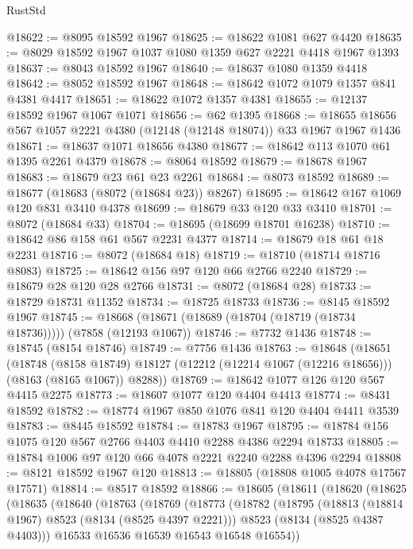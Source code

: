 \begin{lexlean}{RustStd}
\begin{coremodule}
{\begin{coremodule}
{{{{{{{{{{{{{{{{{{{{{{{{{{{{{{{{{{{{{{{{{{{{{{{{{{{{{@18622 := @8095 @18592 @1967
@18625 := @18622 @1081 @627 @4420
@18635 := @8029 @18592 @1967 @1037 @1080 @1359 @627 @2221 @4418 @1967 @1393
@18637 := @8043 @18592 @1967
@18640 := @18637 @1080 @1359 @4418
@18642 := @8052 @18592 @1967
@18648 := @18642 @1072 @1079 @1357 @841 @4381 @4417
@18651 := @18622 @1072 @1357 @4381
@18655 := @12137 @18592 @1967 @1067 @1071
@18656 := @62 @1395
@18668 := @18655 @18656 @567 @1057 @2221 @4380 (@12148 (@12148 @18074)) @33 @1967 @1967 @1436
@18671 := @18637 @1071 @18656 @4380
@18677 := @18642 @113 @1070 @61 @1395 @2261 @4379
@18678 := @8064 @18592
@18679 := @18678 @1967
@18683 := @18679 @23 @61 @23 @2261
@18684 := @8073 @18592
@18689 := @18677 (@18683 (@8072 (@18684 @23)) @8267)
@18695 := @18642 @167 @1069 @120 @831 @3410 @4378
@18699 := @18679 @33 @120 @33 @3410
@18701 := @8072 (@18684 @33)
@18704 := @18695 (@18699 @18701 @16238)
@18710 := @18642 @86 @158 @61 @567 @2231 @4377
@18714 := @18679 @18 @61 @18 @2231
@18716 := @8072 (@18684 @18)
@18719 := @18710 (@18714 @18716 @8083)
@18725 := @18642 @156 @97 @120 @66 @2766 @2240
@18729 := @18679 @28 @120 @28 @2766
@18731 := @8072 (@18684 @28)
@18733 := @18729 @18731 @11352
@18734 := @18725 @18733
@18736 := @8145 @18592 @1967
@18745 := @18668 (@18671 (@18689 (@18704 (@18719 (@18734 @18736))))) (@7858 (@12193 @1067))
@18746 := @7732 @1436
@18748 := @18745 (@8154 @18746)
@18749 := @7756 @1436
@18763 := @18648
    (@18651
      (@18748
        (@8158 @18749)
        @18127
        (@12212 (@12214 @1067 (@12216 @18656)))
        (@8163 (@8165 @1067))
        @8288))
@18769 := @18642 @1077 @126 @120 @567 @4415 @2275
@18773 := @18607 @1077 @120 @4404 @4413
@18774 := @8431 @18592
@18782 := @18774 @1967 @850 @1076 @841 @120 @4404 @4411 @3539
@18783 := @8445 @18592
@18784 := @18783 @1967
@18795 := @18784 @156 @1075 @120 @567 @2766 @4403 @4410 @2288 @4386 @2294 @18733
@18805 := @18784 @1006 @97 @120 @66 @4078 @2221 @2240 @2288 @4396 @2294
@18808 := @8121 @18592 @1967 @120
@18813 := @18805 (@18808 @1005 @4078 @17567 @17571)
@18814 := @8517 @18592
@18866 := @18605
    (@18611
      (@18620
        (@18625
          (@18635
            (@18640
              (@18763
                (@18769
                  (@18773
                    (@18782
                      (@18795
                        (@18813 (@18814 @1967) @8523 (@8134 (@8525 @4397 @2221)))
                        @8523
                        (@8134 (@8525 @4387 @4403)))
                      @16533
                      @16536
                      @16539
                      @16543
                      @16548
                      @16554))
}}}}}}}}}}}}}}}}}}}}}}}}}}}}}}}}}}}}}}}}}}}}}}}}}}}}}
\end{coremodule}}
\end{coremodule}
\end{lexlean}
